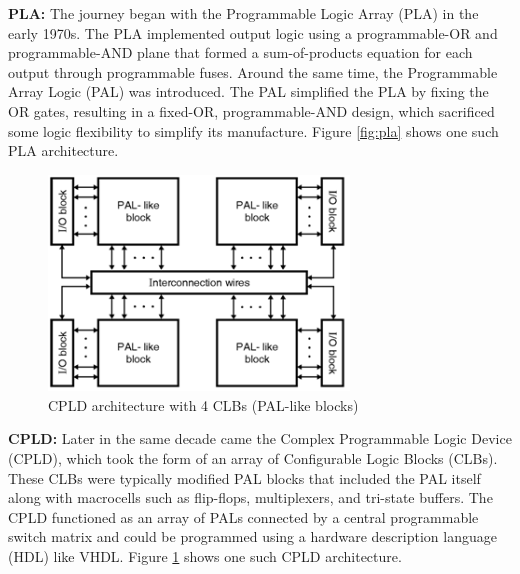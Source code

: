 \documentclass[twocolumn]{article}
\begin{document}
    \textbf{PLA:} \quad
    The journey began with the Programmable Logic Array (PLA) in the early 1970s. 
    The PLA implemented output logic using a programmable-OR and programmable-AND plane that formed a sum-of-products equation for each output through programmable fuses. 
    Around the same time, the Programmable Array Logic (PAL) was introduced. 
    The PAL simplified the PLA by fixing the OR gates, resulting in a fixed-OR, programmable-AND design, which sacrificed some logic flexibility to simplify its manufacture. 
    Figure \ref{fig:pla} shows one such PLA architecture. 

    \begin{figure}
        \centering
        \includegraphics[width=8.0cm]{figures/cpld.png}
        \caption{CPLD architecture with 4 CLBs (PAL-like blocks)}
        \label{fig:cpld}
    \end{figure}

    \textbf{CPLD:} \quad 
    Later in the same decade came the Complex Programmable Logic Device (CPLD), which took the form of an array of Configurable Logic Blocks (CLBs). 
    These CLBs were typically modified PAL blocks that included the PAL itself along with macrocells such as flip-flops, multiplexers, and tri-state buffers. 
    The CPLD functioned as an array of PALs connected by a central programmable switch matrix and could be programmed using a hardware description language (HDL) like VHDL. 
    Figure \ref{fig:cpld} shows one such CPLD architecture. 
\end{document}
